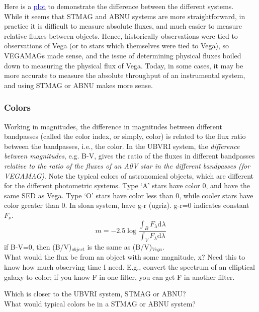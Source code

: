 \documentclass[12pt]{article}
\begin{document}
\noindent Here is a
\href{http://astronomy.nmsu.edu/holtz/a535/html/diagrams/a535/mag.htm}
{\textcolor{blue}{plot}}
to demonstrate the difference between the different systems.\\

\noindent While it seems that STMAG and ABNU systems are more
straightforward, in practice it is difficult to measure absolute
fluxes, and much easier to measure relative fluxes between objects.
Hence, historically observations were tied to observations of Vega (or
to stars which themselves were tied to Vega), so VEGAMAGs made sense,
and the issue of determining physical fluxes boiled down to measuring
the physical flux of Vega. Today, in some cases, it may be more
accurate to measure the absolute throughput of an instrumental system,
and using STMAG or ABNU makes more sense.

\subsubsection*{Colors}
Working in magnitudes, the difference in magnitudes between different
bandpasses (called the color index, or simply, color) is related to
the flux ratio between the bandpasses, i.e., the color.
In the UBVRI
system, the \emph{difference between magnitudes}, e.g. B-V,
gives the ratio of the fluxes in different bandpasses
\emph{relative to the ratio of the fluxes of
an A0V star in the different bandpasses (for VEGAMAG)}.
Note the typical colors of astronomical objects,
which are different for the different photometric systems.
Type `A' stars have color 0, and have the same SED as Vega.
Type `O' stars have color less than 0,
while cooler stars have color greater than 0.
In sloan system, have  g-r (ugriz). g-r=0 indicates constant
$F_{\nu}$.
\begin{equation*}
    m = -2.5\log\frac{\int_B F_{\lambda}\textrm{d}\lambda}
    {\int_V F_{\lambda}\textrm{d}\lambda}
\end{equation*}
if B-V=0, then (B/V)$_{object}$ is the same as (B/V)$_{Vega}$.\\

\noindent What would the flux be from an object with some magnitude,
x? Need this to know how much observing time I need. E.g., convert the
spectrum of an elliptical galaxy to color; if you know F in one
filter, you can get F in another filter.

\noindent Which is closer to the UBVRI system, STMAG or ABNU?\\
\noindent What would typical colors be in a STMAG or ABNU system?\\
\end{document}
